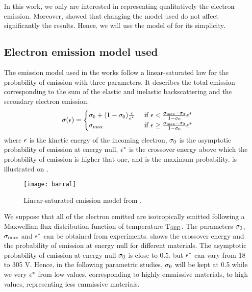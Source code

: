 In this work, we only are interested in representing qualitatively the electron emission.
Moreover, \citet{croes2017} showed that changing the model used do not affect significantly the results. 
Hence, we will use the model of \citet{barral2003a} for its simplicity.

\subsection{Electron emission model used}
\label{sec-modelused}
The emission model used in the works follow a linear-saturated law for the probability of emission with three parameters. 
It describes the total emission corresponding to the sum of the elastic and inelastic backscattering and the secondary electron emission.
\begin{equation} \label{eq-proba_barral}
  \sigma (\epsilon) = 
  \begin{cases}
    \sigma _0 + (1 - \sigma _0) \frac{\epsilon}{\epsilon^{*}}   &\text{ if } \epsilon < \frac{\sigma _{\rm max}  - \sigma _0}{1 - \sigma _0} \epsilon^{*}  \\
    \sigma _{\rm max}  &\text{ if } \epsilon \geq \frac{\sigma _{\rm max}  - \sigma _0}{1 - \sigma _0} \epsilon^{*}
  \end{cases}
\end{equation}
where $\epsilon$ is the kinetic energy of the incoming electron, $\sigma _0$ is the asymptotic probability of emission at energy null, $\epsilon^{*}$ is the crossover energy above which the probability of emission is higher that one, and \probamax is the maximum probability.
 is illustrated on .

\begin{figure}[hbtp]
  \centering
  \texttt{[image: barral]}
  \caption{Linear-saturated emission model from \citet{barral2003a}.}
  \label{fig-modelbarral}
\end{figure}

 We suppose that all of the electron emitted are isotropically emitted following a Maxwellian flux distribution function of temperature $\mathrm{T_{SEE}}$.
 The parameters $\sigma _0$,  $\sigma _{\rm max} $ and $\epsilon^{*}$ can be obtained from experiments. 
  shows the crossover energy and the  probability of emission at energy null for different materials.
 The  asymptotic probability of emission at energy null $\sigma _0$ is close to $0.5$, but $\epsilon^{*}$ can vary from 18 to 305 V.
 Hence, in the following parametric studies, $\sigma _0$ will be kept at 0.5 while we very $\epsilon^{*}$ from low values, corresponding to highly emmissive materials, to high values, representing less emmissive materials.
 
